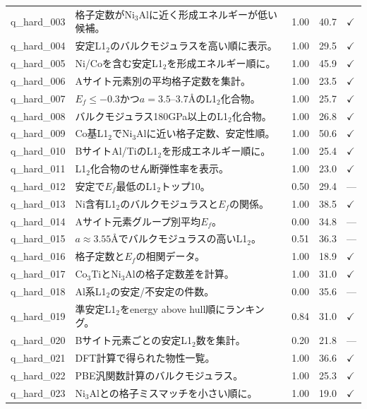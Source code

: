 \documentclass[5p,twocolumn]{elsarticle}
\begin{document}
\begin{longtable}{lp{8.5cm}ccl}
    q\_hard\_003 & 格子定数がNi$_3$Alに近く形成エネルギーが低い候補。 & 1.00 & 40.7 & $\checkmark$ \\
    q\_hard\_004 & 安定L1$_2$のバルクモジュラスを高い順に表示。 & 1.00 & 29.5 & $\checkmark$ \\
    q\_hard\_005 & Ni/Coを含む安定L1$_2$を形成エネルギー順に。 & 1.00 & 45.9 & $\checkmark$ \\
    q\_hard\_006 & Aサイト元素別の平均格子定数を集計。 & 1.00 & 23.5 & $\checkmark$ \\
    q\_hard\_007 & $E_f \leq -0.3$かつ$a = 3.5$--$3.7$\AA のL1$_2$化合物。 & 1.00 & 25.7 & $\checkmark$ \\
    q\_hard\_008 & バルクモジュラス180GPa以上のL1$_2$化合物。 & 1.00 & 26.8 & $\checkmark$ \\
    q\_hard\_009 & Co基L1$_2$でNi$_3$Alに近い格子定数、安定性順。 & 1.00 & 50.6 & $\checkmark$ \\
    q\_hard\_010 & BサイトAl/TiのL1$_2$を形成エネルギー順に。 & 1.00 & 25.4 & $\checkmark$ \\
    q\_hard\_011 & L1$_2$化合物のせん断弾性率を表示。 & 1.00 & 23.0 & $\checkmark$ \\
    q\_hard\_012 & 安定で$E_f$最低のL1$_2$トップ10。 & 0.50 & 29.4 & --- \\
    q\_hard\_013 & Ni含有L1$_2$のバルクモジュラスと$E_f$の関係。 & 1.00 & 38.5 & $\checkmark$ \\
    q\_hard\_014 & Aサイト元素グループ別平均$E_f$。 & 0.00 & 34.8 & --- \\
    q\_hard\_015 & $a \approx 3.55$\AA でバルクモジュラスの高いL1$_2$。 & 0.51 & 36.3 & --- \\
    q\_hard\_016 & 格子定数と$E_f$の相関データ。 & 1.00 & 18.9 & $\checkmark$ \\
    q\_hard\_017 & Co$_3$TiとNi$_3$Alの格子定数差を計算。 & 1.00 & 31.0 & $\checkmark$ \\
    q\_hard\_018 & Al系L1$_2$の安定/不安定の件数。 & 0.00 & 35.6 & --- \\
    q\_hard\_019 & 準安定L1$_2$をenergy above hull順にランキング。 & 0.84 & 31.0 & $\checkmark$ \\
    q\_hard\_020 & Bサイト元素ごとの安定L1$_2$数を集計。 & 0.20 & 21.8 & --- \\
    q\_hard\_021 & DFT計算で得られた物性一覧。 & 1.00 & 36.6 & $\checkmark$ \\
    q\_hard\_022 & PBE汎関数計算のバルクモジュラス。 & 1.00 & 25.3 & $\checkmark$ \\
    q\_hard\_023 & Ni$_3$Alとの格子ミスマッチを小さい順に。 & 1.00 & 19.0 & $\checkmark$ \\

\end{longtable}
\end{document}
